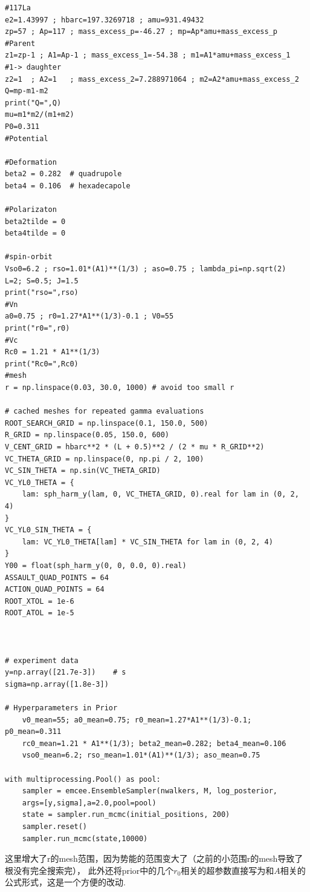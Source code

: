 \documentclass[11pt,a4paper,UTF8,scheme=plain,fontset=fandol]{ctexbook}
\theoremstyle{definition}
\theoremstyle{plain}
\theoremstyle{remark}
\begin{document}
\begin{verbatim}
#117La
e2=1.43997 ; hbarc=197.3269718 ; amu=931.49432
zp=57 ; Ap=117 ; mass_excess_p=-46.27 ; mp=Ap*amu+mass_excess_p        #Parent
z1=zp-1 ; A1=Ap-1 ; mass_excess_1=-54.38 ; m1=A1*amu+mass_excess_1    #1-> daughter
z2=1  ; A2=1   ; mass_excess_2=7.288971064 ; m2=A2*amu+mass_excess_2
Q=mp-m1-m2
print("Q=",Q)
mu=m1*m2/(m1+m2)
P0=0.311
#Potential

#Deformation
beta2 = 0.282  # quadrupole
beta4 = 0.106  # hexadecapole 

#Polarizaton
beta2tilde = 0  
beta4tilde = 0

#spin-orbit
Vso0=6.2 ; rso=1.01*(A1)**(1/3) ; aso=0.75 ; lambda_pi=np.sqrt(2)
L=2; S=0.5; J=1.5
print("rso=",rso)
#Vn
a0=0.75 ; r0=1.27*A1**(1/3)-0.1 ; V0=55
print("r0=",r0)
#Vc
Rc0 = 1.21 * A1**(1/3)          
print("Rc0=",Rc0)
#mesh
r = np.linspace(0.03, 30.0, 1000) # avoid too small r

# cached meshes for repeated gamma evaluations
ROOT_SEARCH_GRID = np.linspace(0.1, 150.0, 500)
R_GRID = np.linspace(0.05, 150.0, 600)
V_CENT_GRID = hbarc**2 * (L + 0.5)**2 / (2 * mu * R_GRID**2)
VC_THETA_GRID = np.linspace(0, np.pi / 2, 100)
VC_SIN_THETA = np.sin(VC_THETA_GRID)
VC_YL0_THETA = {
    lam: sph_harm_y(lam, 0, VC_THETA_GRID, 0).real for lam in (0, 2, 4)
}
VC_YL0_SIN_THETA = {
    lam: VC_YL0_THETA[lam] * VC_SIN_THETA for lam in (0, 2, 4)
}
Y00 = float(sph_harm_y(0, 0, 0.0, 0).real)
ASSAULT_QUAD_POINTS = 64
ACTION_QUAD_POINTS = 64
ROOT_XTOL = 1e-6
ROOT_ATOL = 1e-5



# experiment data
y=np.array([21.7e-3])    # s
sigma=np.array([1.8e-3])

# Hyperparameters in Prior
    v0_mean=55; a0_mean=0.75; r0_mean=1.27*A1**(1/3)-0.1; p0_mean=0.311
    rc0_mean=1.21 * A1**(1/3); beta2_mean=0.282; beta4_mean=0.106
    vso0_mean=6.2; rso_mean=1.01*(A1)**(1/3); aso_mean=0.75

with multiprocessing.Pool() as pool:
    sampler = emcee.EnsembleSampler(nwalkers, M, log_posterior, 
    args=[y,sigma],a=2.0,pool=pool)
    state = sampler.run_mcmc(initial_positions, 200)
    sampler.reset()
    sampler.run_mcmc(state,10000)

\end{verbatim}

这里增大了r的mesh范围，因为势能的范围变大了（之前的小范围r的mesh导致了根没有完全搜索完），
此外还将prior中的几个$r_0$相关的超参数直接写为和$A$相关的公式形式，这是一个方便的改动.
\end{document}

